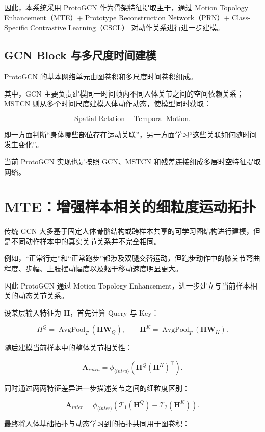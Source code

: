 因此，本系统采用 ProtoGCN 作为骨架特征提取主干，通过 Motion Topology Enhancement（MTE）+ Prototype Reconstruction Network（PRN）+ Class-Specific Contrastive Learning（CSCL） 对动作关系进行进一步建模。

\subsection{GCN Block 与多尺度时间建模}

ProtoGCN 的基本网络单元由图卷积和多尺度时间卷积组成。

其中，GCN 主要负责建模同一时间帧内不同人体关节之间的空间依赖关系；MSTCN 则从多个时间尺度建模人体动作动态，使模型同时获取：

\[
\text{Spatial Relation}
+
\text{Temporal Motion}.
\]

即一方面判断“身体哪些部位存在运动关联”，另一方面学习“这些关联如何随时间发生变化”。

当前 ProtoGCN 实现也是按照 GCN、MSTCN 和残差连接组成多层时空特征提取网络。


\section{MTE：增强样本相关的细粒度运动拓扑}

传统 GCN 大多基于固定人体骨骼结构或跨样本共享的可学习图结构进行建模，但是不同动作样本中的真实关节关系并不完全相同。

例如，“正常行走”和“正常跑步”都涉及双腿交替运动，但跑步动作中的膝关节弯曲程度、步幅、上肢摆动幅度以及躯干移动速度明显更大。

因此 ProtoGCN 通过 Motion Topology Enhancement，进一步建立与当前样本相关的动态关节关系。

设某层输入特征为 \(\mathbf H\)，首先计算 Query 与 Key：

\[
H^{Q}
=
\operatorname{AvgPool}_{T}
(\mathbf H\mathbf W_Q),
\qquad
\mathbf H^{K}
=
\operatorname{AvgPool}_{T}
(\mathbf H\mathbf W_K).
\]

随后建模当前样本中的整体关节相关性：

\[
\mathbf A_{intra}
=
\phi_{\langle intra\rangle}
\left(
\mathbf H^{Q}
(\mathbf H^{K})^{\top}
\right).
\]

同时通过两两特征差异进一步描述关节之间的细粒度区别：

\[
\mathbf A_{inter}
=
\phi_{\langle inter\rangle}
\left(
\mathcal T_1(\mathbf H^Q)
-
\mathcal T_2(\mathbf H^K)
\right).
\]

最终将人体基础拓扑与动态学习到的拓扑共同用于图卷积：

